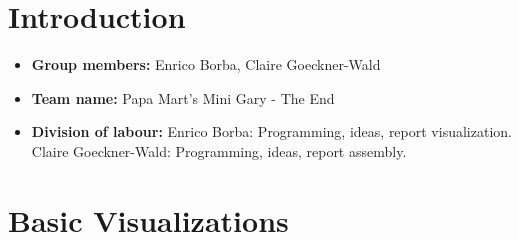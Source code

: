 
\newif\ifshowsolutions
\showsolutionstrue

\newcommand{\boldline}[1]{\underline{\textbf{#1}}}

\usepackage{graphicx}
\graphicspath{ {images/} }



\pagestyle{fancy}





\section{Introduction}
\medskip
\begin{itemize}
    \item \textbf{Group members:} Enrico Borba, Claire Goeckner-Wald
    \item \textbf{Team name:} Papa Mart's Mini Gary - The End
    \item \textbf{Division of labour:}
        Enrico Borba: Programming, ideas, report visualization.
        Claire Goeckner-Wald: Programming, ideas, report assembly.
\end{itemize}


\section{Basic Visualizations}
\medskip

